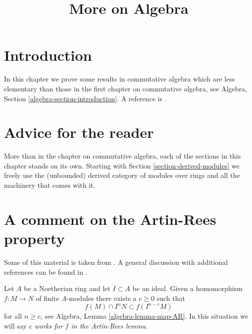 

%


\title{More on Algebra}


\maketitle

\label{section-phantom}

\tableofcontents



\section{Introduction}
\label{section-introduction}

\noindent
In this chapter we prove some results in commutative algebra which
are less elementary than those in the first chapter on commutative
algebra, see
Algebra, Section \ref{algebra-section-introduction}.
A reference is \cite{MatCA}.






\section{Advice for the reader}
\label{section-advice}

\noindent
More than in the chapter on commutative algebra, each of the sections in
this chapter stands on its own. Starting with
Section \ref{section-derived-modules}
we freely use the (unbounded) derived category of modules over rings and all
the machinery that comes with it.






\section{A comment on the Artin-Rees property}
\label{section-artin-rees}

\noindent
Some of this material is taken from \cite{conrad-dejong}. A general
discussion with additional references can be found in
\cite[Section 1]{Eis}.

\medskip\noindent
Let $A$ be a Noetherian ring and let $I \subset A$ be an ideal. Given a
homomorphism $f : M \to N$ of finite $A$-modules there exists a $c \geq 0$
such that
$$
f(M) \cap I^nN \subset f(I^{n - c}M)
$$
for all $n \geq c$, see Algebra, Lemma \ref{algebra-lemma-map-AR}. In this
situation we will say {\it $c$ works for $f$ in the Artin-Rees lemma}.

